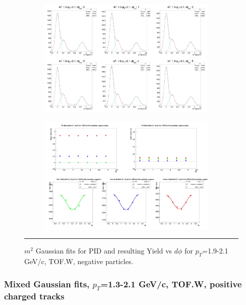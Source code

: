 \begin{figure}[H]
  \centering
    \begin{subfigure}[p]{1\textwidth}
   \centering
   \includegraphics[width=0.94\textwidth]{lowptfits/yieldvsdphi_tof1_cent0_ch0_pT-19-21.jpg}
    \end{subfigure}
    \begin{subfigure}[p]{1\textwidth}
   \centering
   \includegraphics[width=0.94\textwidth]{lowptfits/fitParams_tof1_cent0_ch0_pT-19-21.jpg}
    \end{subfigure}
    \rule{35em}{0.5pt}
  \caption[PID fits and Yield vs $d\phi$ for $p_T$=1.9-2.1 GeV/c, TOF.W, negative particles. ]{$m^2$ Gaussian fits for PID and resulting Yield vs $d\phi$ for $p_T$=1.9-2.1 GeV/c, TOF.W, negative particles.}
  \label{fig:fits19-21neg}
\end{figure}

\subsubsection{Mixed Gaussian fits, $p_T$=1.3-2.1 GeV/c, TOF.W, positive charged tracks}

